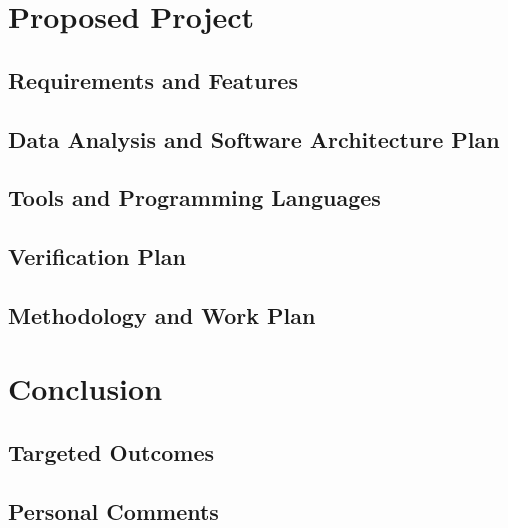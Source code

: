 \documentclass[11pt]{article}   	%
\begin{document}
\section{Proposed Project}
\subsection{Requirements and Features}
\subsection{Data Analysis and Software Architecture Plan}
\subsection{Tools and Programming Languages}
\subsection{Verification Plan}
\subsection{Methodology and Work Plan}

\section{Conclusion}
\subsection{Targeted Outcomes}
\subsection{Personal Comments}





\end{document}
